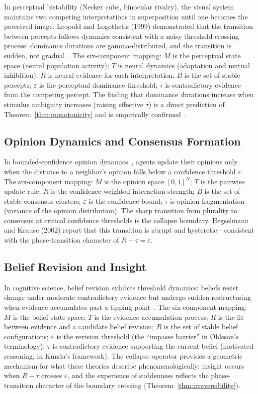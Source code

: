 \documentclass[11pt]{article}
\theoremstyle{plain}
\begin{document}
In perceptual bistability (Necker cube, binocular rivalry), the visual system maintains two
competing interpretations in superposition until one becomes the perceived image. Leopold and
Logothetis (1999) demonstrated that the transition between percepts follows dynamics consistent
with a noisy threshold-crossing process: dominance durations are gamma-distributed, and the
transition is sudden, not gradual~\cite{leopold1999}. The six-component mapping: $M$ is the
perceptual state space (neural population activity); $T$ is neural dynamics (adaptation and mutual
inhibition); $R$ is neural evidence for each interpretation; $B$ is the set of stable percepts;
$\varepsilon$ is the perceptual dominance threshold; $\tau$ is contradictory evidence from the
competing percept. The finding that dominance durations increase when stimulus ambiguity increases
(raising effective $\tau$) is a direct prediction of Theorem~\ref{thm:monotonicity} and is
empirically confirmed~\cite{leopold1999}.

\subsection{Opinion Dynamics and Consensus Formation}

In bounded-confidence opinion dynamics~\cite{deffuant2000, hegselmann2002}, agents update their
opinions only when the distance to a neighbor's opinion falls below a confidence threshold
$\varepsilon$. The six-component mapping: $M$ is the opinion space $[0, 1]^N$; $T$ is the pairwise
update rule; $R$ is the confidence-weighted interaction strength; $B$ is the set of stable
consensus clusters; $\varepsilon$ is the confidence bound; $\tau$ is opinion fragmentation
(variance of the opinion distribution). The sharp transition from plurality to consensus at
critical confidence thresholds is the collapse boundary. Hegselmann and Krause (2002) report that
this transition is abrupt and hysteretic---consistent with the phase-transition character of
$R - \tau = \varepsilon$.

\subsection{Belief Revision and Insight}

In cognitive science, belief revision exhibits threshold dynamics: beliefs resist change under
moderate contradictory evidence but undergo sudden restructuring when evidence accumulates past a
tipping point~\cite{kunda1990, ohlsson2011}. The six-component mapping: $M$ is the belief state
space; $T$ is the evidence accumulation process; $R$ is the fit between evidence and a candidate
belief revision; $B$ is the set of stable belief configurations; $\varepsilon$ is the revision
threshold (the ``impasse barrier'' in Ohlsson's terminology); $\tau$ is contradictory evidence
supporting the current belief (motivated reasoning, in Kunda's framework). The collapse operator
provides a geometric mechanism for what these theories describe phenomenologically: insight occurs
when $R - \tau$ crosses $\varepsilon$, and the experience of suddenness reflects the
phase-transition character of the boundary crossing (Theorem~\ref{thm:irreversibility}).
\end{document}
